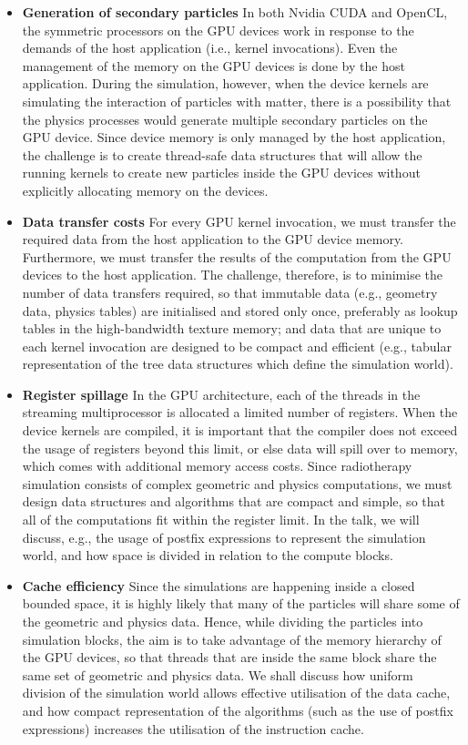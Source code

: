 \documentclass[a4paper]{article}
\begin{document}
\begin{itemize}
\item {\bf Generation of secondary particles} In both Nvidia CUDA and OpenCL, the symmetric processors on the GPU devices work in response to the demands of the host application (i.e., kernel invocations). Even the management of the memory on the GPU devices is done by the host application. During the simulation, however, when the device kernels are simulating the interaction of particles with matter, there is a possibility that the physics processes would generate multiple secondary particles on the GPU device. Since device memory is only managed by the host application, the challenge is to create thread-safe data structures that will allow the running kernels to create new particles inside the GPU devices without explicitly allocating memory on the devices.

\item {\bf Data transfer costs} For every GPU kernel invocation, we must transfer the required data from the host application to the GPU device memory. Furthermore, we must transfer the results of the computation from the GPU devices to the host application. The challenge, therefore, is to minimise the number of data transfers required, so that immutable data (e.g., geometry data, physics tables) are initialised and stored only once, preferably as lookup tables in the high-bandwidth texture memory; and data that are unique to each kernel invocation are designed to be compact and efficient (e.g., tabular representation of the tree data structures which define the simulation world).

\item {\bf Register spillage} In the GPU architecture, each of the threads in the streaming multiprocessor is allocated a limited number of registers. When the device kernels are compiled, it is important that the compiler does not exceed the usage of registers beyond this limit, or else data will spill over to memory, which comes with additional memory access costs. Since radiotherapy simulation consists of complex geometric and physics computations, we must design data structures and algorithms that are compact and simple, so that all of the computations fit within the register limit. In the talk, we will discuss, e.g., the usage of postfix expressions to represent the simulation world, and how space is divided in relation to the compute blocks. 

\item {\bf Cache efficiency} Since the simulations are happening inside a closed bounded space, it is highly likely that many of the particles will share some of the geometric and physics data. Hence, while dividing the particles into simulation blocks, the aim is to take advantage of the memory hierarchy of the GPU devices, so that threads that are inside the same block share the same set of geometric and physics data. We shall discuss how uniform division of the simulation world allows effective utilisation of the data cache, and how compact representation of the algorithms (such as the use of postfix expressions) increases the utilisation of the instruction cache.
\end{itemize}
\end{document}
